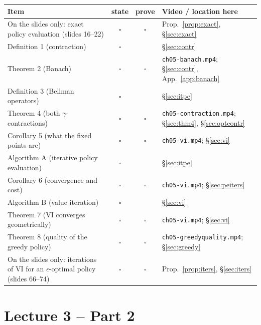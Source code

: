 \documentclass[11pt,a4paper]{article}
\theoremstyle{plain}
\theoremstyle{definition}
\theoremstyle{remark}
\begin{document}
\begin{center}
\small
\renewcommand{\arraystretch}{1.2}
\begin{tabular}{@{}>{\raggedright\arraybackslash}p{6.0cm}cc>{\raggedright\arraybackslash}p{4.9cm}@{}}
\toprule
\textbf{Item} & \textbf{state} & \textbf{prove} & \textbf{Video / location here}\\
\midrule
On the slides only: exact policy evaluation (slides 16--22) & $\square$ & $\square$ & Prop.~\ref{prop:exact}, \S\ref{sec:exact}\\
Definition 1 (contraction) & $\square$ & & \S\ref{sec:contr}\\
Theorem 2 (Banach) & $\square$ & $\square$ & \texttt{ch05-banach.mp4}; \S\ref{sec:contr}, App.~\ref{app:banach}\\
Definition 3 (Bellman operators) & $\square$ & & \S\ref{sec:itpe}\\
Theorem 4 (both $\gamma$-contractions) & $\square$ & $\square$ & \texttt{ch05-contraction.mp4}; \S\ref{sec:thm4}, \S\ref{sec:optcontr}\\
Corollary 5 (what the fixed points are) & $\square$ & $\square$ & \texttt{ch05-vi.mp4}; \S\ref{sec:vi}\\
Algorithm A (iterative policy evaluation) & $\square$ & & \S\ref{sec:itpe}\\
Corollary 6 (convergence and cost) & $\square$ & $\square$ & \texttt{ch05-vi.mp4}; \S\ref{sec:peiters}\\
Algorithm B (value iteration) & $\square$ & & \S\ref{sec:vi}\\
Theorem 7 (VI converges geometrically) & $\square$ & $\square$ & \texttt{ch05-vi.mp4}; \S\ref{sec:vi}\\
Theorem 8 (quality of the greedy policy) & $\square$ & $\square$ & \texttt{ch05-greedyquality.mp4}; \S\ref{sec:greedy}\\
On the slides only: iterations of VI for an $\epsilon$-optimal policy (slides 66--74) & $\square$ & $\square$ & Prop.~\ref{prop:iters}, \S\ref{sec:iters}\\
\bottomrule
\end{tabular}
\end{center}

\newpage

\setcounter{section}{0}
\renewcommand{\thesection}{\arabic{section}}
\part{Lecture 3 -- Part 2}
\end{document}
